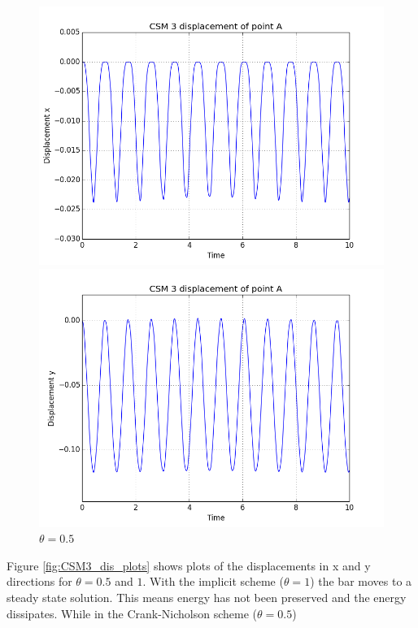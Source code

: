 \begin{figure}[H]
\begin{minipage}[b]{0.6\linewidth}
    \caption{$\theta = 1 $} 
    \vspace{4ex}
  \end{minipage} 
  \begin{minipage}[b]{0.6\linewidth}
    \centering
    \includegraphics[scale=0.40]{./Temporal_stability/CSM3_Crank.png} 
    \caption{$\theta = 0.5 $} 
    \vspace{4ex}
  \end{minipage}%
  \begin{minipage}[b]{0.6\linewidth}
    \centering
    \includegraphics[scale=0.40]{./Temporal_stability/CSM3_Crank_y.png} 
    \caption{$\theta = 0.5 $} 
    \vspace{4ex}
  \end{minipage} 
\end{figure}
Figure \ref{fig:CSM3_dis_plots} shows plots of the displacements in x and y directions for $\theta = 0.5$ and $1$. With the implicit scheme ($\theta=1$) the bar moves to a steady state solution. This means energy has not been preserved and the energy dissipates. While in the Crank-Nicholson scheme ($\theta = 0.5$)

